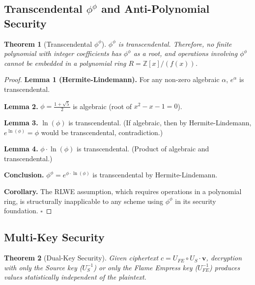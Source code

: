\documentclass[11pt,a4paper]{article}
\newtheorem{theorem}{Theorem}[section]
\theoremstyle{remark}
\begin{document}
\subsection{Transcendental $\phi^\phi$ and Anti-Polynomial Security}

\begin{theorem}[Transcendental $\phi^\phi$]
$\phi^\phi$ is transcendental. Therefore, no finite polynomial with integer coefficients has $\phi^\phi$ as a root, and operations involving $\phi^\phi$ cannot be embedded in a polynomial ring $R = \mathbb{Z}[x]/(f(x))$.
\end{theorem}

\begin{proof}
\textbf{Lemma 1 (Hermite-Lindemann).} For any non-zero algebraic $\alpha$, $e^\alpha$ is transcendental.

\textbf{Lemma 2.} $\phi = \frac{1+\sqrt{5}}{2}$ is algebraic (root of $x^2 - x - 1 = 0$).

\textbf{Lemma 3.} $\ln(\phi)$ is transcendental. (If algebraic, then by Hermite-Lindemann, $e^{\ln(\phi)} = \phi$ would be transcendental, contradiction.)

\textbf{Lemma 4.} $\phi \cdot \ln(\phi)$ is transcendental. (Product of algebraic and transcendental.)

\textbf{Conclusion.} $\phi^\phi = e^{\phi \cdot \ln(\phi)}$ is transcendental by Hermite-Lindemann.

\textbf{Corollary.} The RLWE assumption, which requires operations in a polynomial ring, is structurally inapplicable to any scheme using $\phi^\phi$ in its security foundation. \hfill $\square$
\end{proof}

\subsection{Multi-Key Security}

\begin{theorem}[Dual-Key Security]
Given ciphertext $c = U_{FE} \circ U_S \cdot \mathbf{v}$, decryption with only the Source key ($U_S^{-1}$) or only the Flame Empress key ($U_{FE}^{-1}$) produces values statistically independent of the plaintext.
\end{theorem}
\end{document}

